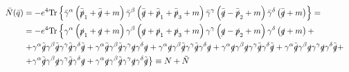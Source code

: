 \begin{align*}
\bar{N} (\bar{q}) & = -e^4 \mathrm{Tr} \left\lbrace \bar{\gamma}^{\alpha} \left( \bar{\slashed{p}}_1 + \bar{\slashed{q}} + m \right) \bar{\gamma}^{\beta} \left( \bar{\slashed{q}} +  \bar{\slashed{p}}_1 + \bar{\slashed{p}}_3 + m \right) \bar{\gamma}^{\gamma} \left( \bar{\slashed{q}} - \bar{\slashed{p}}_2 + m \right) \bar{\gamma}^{\delta} \left( \bar{\slashed{q}} + m \right) \right\rbrace = & \\
& = -e^4 \mathrm{Tr} \left\lbrace \gamma^{\alpha} \left( \slashed{p}_1 + \slashed{q} + m \right) \gamma^{\beta} \left( \slashed{q} +  \slashed{p}_1 + \slashed{p}_3 + m \right) \gamma^{\gamma} \left( \slashed{q} - \slashed{p}_2 + m \right) \gamma^{\delta} \left( \slashed{q} + m \right) + \right. &  \\
&  \left. + \gamma^{\alpha} \tilde{\slashed{q}} \gamma^{\beta} \tilde{\slashed{q}} \gamma^{\gamma} \tilde{\slashed{q}} \gamma^{\delta} \tilde{\slashed{q}} + \gamma^{\alpha} \tilde{\slashed{q}} \gamma^{\beta} \tilde{\slashed{q}} \gamma^{\gamma} \slashed{q} \gamma^{\delta} \slashed{q}  + \gamma^{\alpha} \slashed{q} \gamma^{\beta} \tilde{\slashed{q}} \gamma^{\gamma} \tilde{\slashed{q}} \gamma^{\delta} \slashed{q} + \gamma^{\alpha} \slashed{q} \gamma^{\beta} \slashed{q} \gamma^{\gamma} \tilde{\slashed{q}} \gamma^{\delta} \tilde{\slashed{q}} + \gamma^{\alpha} \tilde{\slashed{q}} \gamma^{\beta} \slashed{q} \gamma^{\gamma} \slashed{q} \gamma^{\delta} \tilde{\slashed{q}} + \right. & \\
& \left. + \gamma^{\alpha} \tilde{\slashed{q}} \gamma^{\beta} \slashed{q} \gamma^{\gamma} \tilde{\slashed{q}} \gamma^{\delta} \slashed{q} + \gamma^{\alpha} \slashed{q} \gamma^{\beta} \tilde{\slashed{q}} \gamma^{\gamma} \slashed{q} \gamma^{\delta} \tilde{\slashed{q}} \right\rbrace \equiv N + \tilde{N} &
\end{align*}

